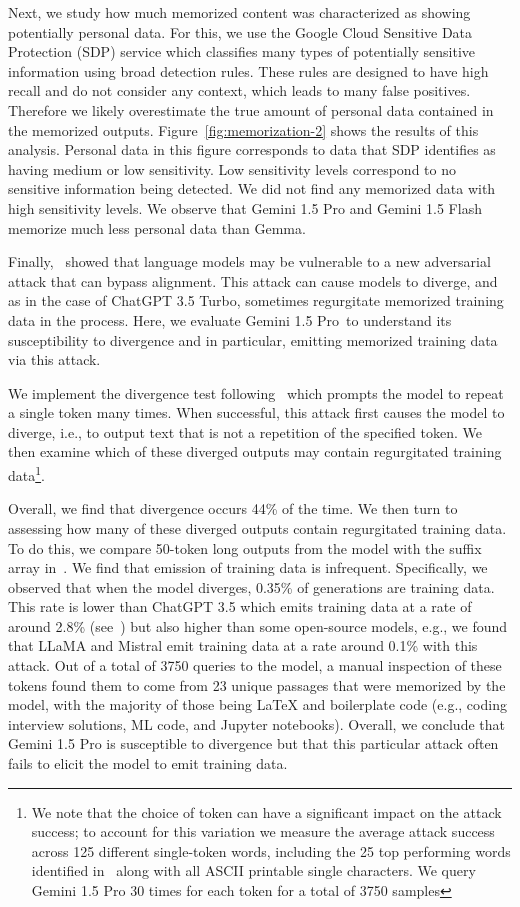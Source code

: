 Next, we study how much memorized content was characterized as showing potentially personal data. For this, we use the Google Cloud Sensitive Data Protection (SDP) service which classifies many types of potentially sensitive information using broad detection rules. These rules are designed to have high recall and do not consider any context, which leads to many false positives. Therefore we likely overestimate the true amount of personal data contained in the memorized outputs. Figure~\ref{fig:memorization-2} shows the results of this analysis. Personal data in this figure corresponds to data that SDP identifies as having medium or low sensitivity. Low sensitivity levels correspond to no sensitive information being detected. We did not find any memorized data with high sensitivity levels. We observe that Gemini 1.5 Pro and Gemini 1.5 Flash memorize much less personal data than Gemma.

Finally,~\citet{nasr2023scalable} showed that language models may be vulnerable to a new adversarial attack that can bypass alignment. This attack can cause models to diverge, and as in the case of ChatGPT 3.5 Turbo, sometimes regurgitate memorized training data in the process. Here, we evaluate Gemini 1.5 Pro\ to understand its susceptibility to divergence and in particular, emitting memorized training data via this attack.

We implement the divergence test following~\citet{nasr2023scalable} which prompts the model to repeat a single token many times. When successful, this attack first causes the model to diverge, i.e., to output text that is not a repetition of the specified token. We then examine which of these diverged outputs may contain regurgitated training data\footnote{We note that the choice of token can have a significant impact on the attack success; to account for this variation we measure the average attack success across 125 different single-token words, including the 25 top performing words identified in~\cite[Figure 7.]{nasr2023scalable} along with all ASCII printable single characters. We query Gemini 1.5 Pro 30 times for each token for a total of 3750 samples}. 

Overall, we find that divergence occurs 44\% of the time. We then turn to assessing how many of these diverged outputs contain regurgitated training data. To do this, we compare 50-token long outputs from the model with the suffix array in~\citet{nasr2023scalable}. We find that emission of training data is infrequent. Specifically, we observed that when the model diverges, 0.35\% of generations are training data. This rate is lower than ChatGPT 3.5 which emits training data at a rate of around 2.8\% (see~\citet[Figure 1.]{nasr2023scalable}) but also higher than some open-source models, e.g., we found that LLaMA and Mistral emit training data at a rate around 0.1\% with this attack. Out of a total of 3750 queries to the model, a manual inspection of these tokens found them to come from 23 unique passages that were memorized by the model, with the majority of those being LaTeX and boilerplate code (e.g., coding interview solutions, ML code, and Jupyter notebooks). Overall, we conclude that Gemini 1.5 Pro is susceptible to divergence but that this particular attack often fails to elicit the model to emit training data.

